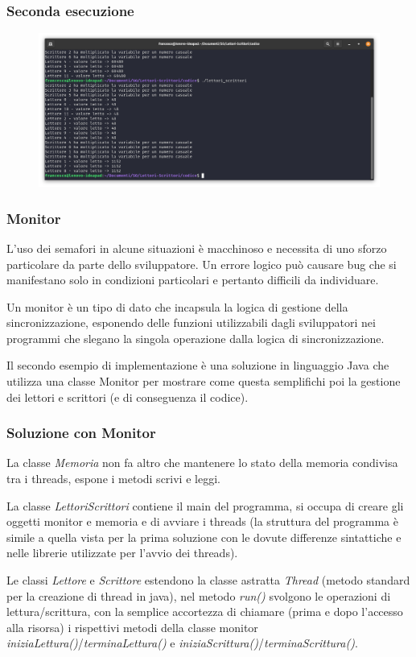 \documentclass[10pt]{beamer}
\begin{document}
	\begin{frame}[fragile]
		\frametitle{Seconda esecuzione}
		\begin{figure}
			\centering
			\includegraphics[width=1.03\linewidth]{img/esecuzione/programC2}
			\label{fig:programc1}
		\end{figure}
	\end{frame}


\begin{frame}
	\frametitle{Monitor}
	L'uso dei semafori in alcune situazioni è macchinoso e necessita di uno sforzo particolare da parte dello sviluppatore. Un errore logico può causare bug che si manifestano solo in condizioni particolari e pertanto difficili da individuare.
	
	Un monitor è un tipo di dato che incapsula la logica di gestione della sincronizzazione, esponendo delle funzioni utilizzabili dagli sviluppatori nei programmi che slegano la singola operazione dalla logica di sincronizzazione.
	
	Il secondo esempio di implementazione è una soluzione in linguaggio Java che utilizza una classe Monitor per mostrare come questa semplifichi poi la gestione dei lettori e scrittori (e di conseguenza il codice).
\end{frame}

\begin{frame}
	\frametitle{Soluzione con Monitor}
	La classe \emph{Memoria} non fa altro che mantenere lo stato della memoria condivisa tra i threads, espone i metodi scrivi e leggi.
	
	La classe \emph{LettoriScrittori} contiene il main del programma, si occupa di creare gli oggetti monitor e memoria e di avviare i threads (la struttura del programma è simile a quella vista per la prima soluzione con le dovute differenze sintattiche e nelle librerie utilizzate per l'avvio dei threads).
	
	Le classi \emph{Lettore} e \emph{Scrittore} estendono la classe astratta \emph{Thread} (metodo standard per la creazione di thread in java), nel metodo \emph{run()} svolgono le operazioni di lettura/scrittura, con la semplice accortezza di chiamare (prima e dopo l'accesso alla risorsa) i rispettivi metodi della classe monitor \emph{iniziaLettura()}/\emph{terminaLettura()} e \emph{iniziaScrittura()}/\emph{terminaScrittura()}.
\end{frame}
\end{document}
